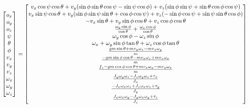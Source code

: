 \begin{equation}
   \begin{bmatrix} o_x \\ o_y \\ o_z \\ \psi \\ \theta \\ \phi \\ v_x \\ v_y \\ v_z \\ \omega_x \\ \omega_y \\ \omega_z \end{bmatrix}  = \begin{bmatrix}
   v_x\cos{\psi}\cos{\theta}+v_y(\sin{\phi}\sin{\theta}\cos{\psi}-\sin{\psi}\cos{\phi})+v_z(\sin{\phi}\sin{\psi}+\sin{\theta}\cos{\phi}\cos{\psi}) \\
   v_x\sin{\psi}\cos{\theta}+v_y(\sin{\phi}\sin{\psi}\sin{\theta}+\cos{\phi}\cos{\psi})+v_z(-\sin{\phi}\cos{\psi}+\sin{\psi}\sin{\theta}\cos{\phi}) \\ 
   -v_x\sin{\theta}+v_y\sin{\phi}\cos{\theta}+v_z\cos{\phi}\cos{\theta} \\
   \frac{\omega_{y}\sin{\phi}}{\cos{\theta}}+\frac{\omega_{z}\cos{\phi}}{\cos{\theta}} \\ 
   \omega_{y}\cos{\phi} -\omega_{z}\sin{\phi} \\
   \omega_x+\omega_{y}\sin{\phi}\tan{\theta}+\omega_{z}\cos{\phi}\tan{\theta} \\ 
   \vspace{1.5pt}
   \frac{gm\sin{\theta}+mv_{y}\omega_{z}-mv_{z}\omega_{y}}{m} \\
   \vspace{2.5pt}
   \frac{-gm\sin{\phi}\cos{\theta}-mv_{x}\omega_{z}+mv_{z}\omega_{x}}{m} \\
   \vspace{2.5pt}
   \frac{f_z-gm\cos{\phi}\cos{\theta}+mv_{x}\omega_{y}-mv_{y}\omega_{x}}{m} \\
   \vspace{2.5pt}
   \frac{J_{y}\omega_{y}\omega_{z}-J_{z}\omega_{y}\omega_{z}+\tau_x}{J_x} \\
   \vspace{2.5pt}
   \frac{-J_{x}\omega_{x}\omega_{z}+J_{z}\omega_{x}\omega_{z}+\tau_y}{J_y} \\ 
   \vspace{2.5pt}
   \frac{J_{x}\omega_{x}\omega_{y}-J_{y}\omega_{x}\omega_{y}+\tau_z}{J_z}
   \end{bmatrix} 
\end{equation}

